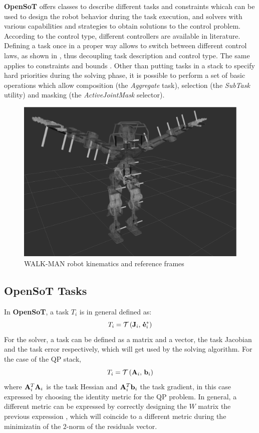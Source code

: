 \textbf{OpenSoT} offers classes %
to describe different tasks and constraints whicah can be used to design the robot behavior during the task execution, and solvers with various capabilities and strategies to obtain solutions to the control problem. According to the control type, different controllers are available in literature. Defining a task once in a proper way allows to switch between different control laws, as shown in \cite{Nakanishi08operationalspace}, thus decoupling task description and control type.
The same applies to constraints and bounds \cite{flacco2012-cr}. 
Other than putting tasks in a stack to specify hard priorities during the solving phase, it is possible to perform a set of basic operations which allow composition (the \emph{Aggregate} task), selection (the \emph{SubTask} utility) and masking (the \emph{ActiveJointMask} selector).

\begin{figure}[htb] 
\centering 
\includegraphics[width=\textwidth]{images/walkman_kinematics.eps} 
\caption{WALK-MAN robot kinematics and reference frames} 
\label{walkman_kinematics}
\end{figure}

\subsection{OpenSoT Tasks}
In \textbf{OpenSoT}, a task $T_i$ is in general defined as:
\begin{equation}
T_i = \mathcal{T} \left( \mathbf{J}_i,\, \mathbf{\dot{e}}^*_i \right)
\end{equation}
For the solver, a task can be defined as a matrix and a vector, the task Jacobian and the task error respectively, which will get used by the solving algorithm. For the case of the QP stack,
\begin{equation}
T_i = \mathcal{T} \left( \mathbf{A}_i,\, \mathbf{b}_i \right)
\end{equation}
where $\mathbf{A}_i^T\mathbf{A}_i$ is the task Hessian and $\mathbf{A}_i^T\mathbf{b}_i$ the task gradient, in this case expressed by choosing the identity metric for the QP problem. In general, a different metric can be expressed by correctly designing the $W$ matrix the previous expression , which will coincide to a different metric during the minimizatin of the $2$-norm of the residuals vector.

